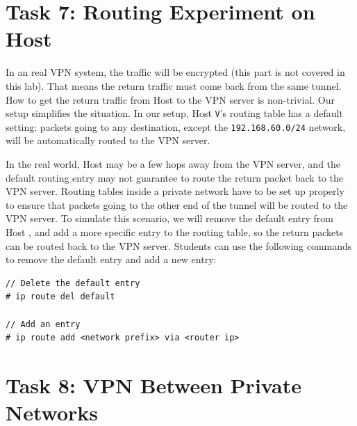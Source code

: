 \section{Task 7: Routing Experiment on Host \hostv}

In an real VPN system, the traffic will be encrypted (this part is not covered
in this lab). That means the return traffic must come back
from the same tunnel. How to get the return traffic from Host \hostv to the VPN server
is non-trivial. Our setup simplifies the situation. In our setup, 
Host \texttt{V}'s routing table has a default setting: packets going to
any destination, except the \texttt{192.168.60.0/24} network,   
will be automatically routed to the VPN server.  

In the real world, Host \hostv may be a few hops away from the VPN server, 
and the default routing entry 
may not guarantee to route the return packet back to the VPN server. Routing tables inside a 
private network have to be set up properly to ensure that packets going to the other end of the
tunnel will be routed to the VPN server. To simulate this scenario, we will 
remove the default entry from Host \hostv, and add a more specific entry to the routing 
table, so the return packets can be routed back to the VPN server.
Students can use the following commands to remove the default entry 
and add a new entry: 

\begin{lstlisting}
// Delete the default entry
# ip route del default

// Add an entry
# ip route add <network prefix> via <router ip>
\end{lstlisting}



\section{Task 8: VPN Between Private Networks} 


